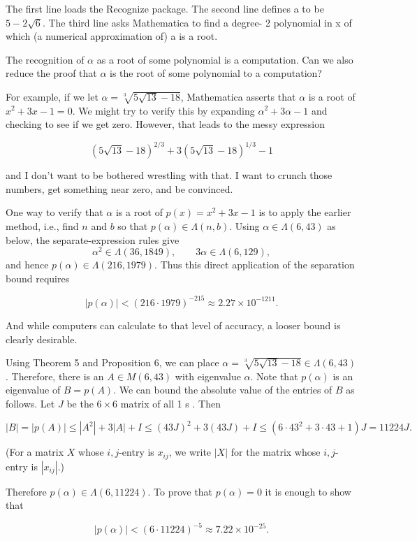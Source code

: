 \documentclass[11pt,letterpaper]{article}
\begin{document}
The first line loads the Recognize package. The second line defines a to be $5-2 \sqrt{6}$. The third line asks Mathematica to find a degree- 2 polynomial in x of which (a numerical approximation of) a is a root.

The recognition of $\alpha$ as a root of some polynomial is a computation. Can we also reduce the proof that $\alpha$ is the root of some polynomial to a computation?

For example, if we let $\alpha=\sqrt[3]{5 \sqrt{13}-18}$, Mathematica asserts that $\alpha$ is a root of $x^{2}+3 x-1=0$. We might try to verify this by expanding $\alpha^{2}+3 \alpha-1$ and checking to see if we get zero. However, that leads to the messy expression

\[
(5 \sqrt{13}-18)^{2 / 3}+3(5 \sqrt{13}-18)^{1 / 3}-1
\]

and I don't want to be bothered wrestling with that. I want to crunch those numbers, get something near zero, and be convinced.

One way to verify that $\alpha$ is a root of $p(x)=x^{2}+3 x-1$ is to apply the earlier method, i.e., find $n$ and $b$ so that $p(\alpha) \in \Lambda(n, b)$. Using $\alpha\in\Lambda(6,43)$ as below, the separate-expression rules give
\[
\alpha^2\in\Lambda(36,1849),\qquad 3\alpha\in\Lambda(6,129),
\]
and hence $p(\alpha)\in\Lambda(216,1979)$. Thus this direct application of the separation bound requires

\[
|p(\alpha)|<(216\cdot1979)^{-215}\approx2.27\times10^{-1211} .
\]

And while computers can calculate to that level of accuracy, a looser bound is clearly desirable.

Using Theorem 5 and Proposition 6, we can place $\alpha=\sqrt[3]{5 \sqrt{13}-18} \in \Lambda(6,43)$. Therefore, there is an $A \in M(6,43)$ with eigenvalue $\alpha$. Note that $p(\alpha)$ is an eigenvalue of $B=p(A)$. We can bound the absolute value of the entries of $B$ as follows. Let $J$ be the $6 \times 6$ matrix of all 1 s . Then

\[
|B|=|p(A)| \leq\left|A^{2}\right|+3|A|+I \leq(43 J)^{2}+3(43 J)+I \leq(6\cdot43^2+3\cdot43+1)J=11224J .
\]

(For a matrix $X$ whose $i, j$-entry is $x_{i j}$, we write $|X|$ for the matrix whose $i, j$-entry is $\left|x_{i j}\right|$.)

Therefore $p(\alpha) \in \Lambda(6,11224)$. To prove that $p(\alpha)=0$ it is enough to show that

\[
|p(\alpha)|<(6 \cdot 11224)^{-5} \approx 7.22\times10^{-25} .
\]
\end{document}
